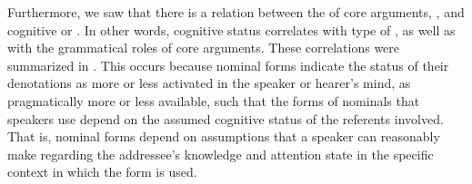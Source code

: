 Furthermore, we saw that there is a relation between the  of core arguments, , and cognitive or . In other words, cognitive status correlates with type of , as well as with the grammatical roles of core arguments. These correlations were summarized in . This occurs because nominal forms indicate the status of their denotations as more or less activated in the speaker or hearer's mind, as pragmatically more or less available, such that the forms of nominals that speakers use depend on the assumed cognitive status of the referents involved. That is, nominal forms depend on assumptions that a speaker can reasonably make regarding the addressee's knowledge and attention state in the specific context in which the form is used. 


